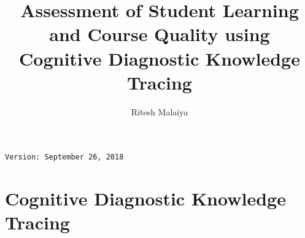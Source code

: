 \documentclass[krantz2]{krantz} %
\begin{document}
\frontmatter
\title{Assessment of Student Learning and Course Quality using Cognitive Diagnostic Knowledge Tracing} %
\author{Ritesh Malaiya}
\maketitle


\begin{verbatim}
Version: September 26, 2018
\end{verbatim}


%
\setcounter{page}{7} %


\tableofcontents





%
%


\mainmatter
%
%
% 
%
\part{Cognitive Diagnostic Knowledge Tracing}

%
%
%
%
%
%
%
%
%
%
%
%





\end{document}
